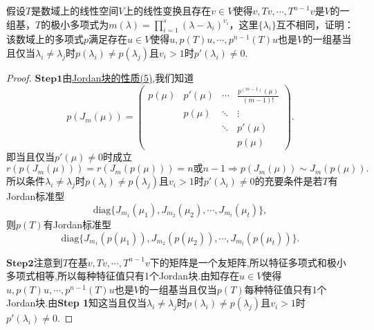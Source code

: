 \documentclass[../../main.tex]{subfiles}%
\begin{document}
\begin{example}
假设\( T \)是数域上的线性空间\( V \)上的线性变换且存在\( v \in V \)使得\( v,Tv,\cdots,T^{n-1}v \)是\( V \)的一组基，\( T \)的极小多项式为\( m(\lambda)=\prod_{i=1}^{s}(\lambda-\lambda_i)^{v_i} \)，这里\( \{\lambda_i\} \)互不相同，证明：该数域上的多项式\( p \)满足存在\( u \in V \)使得\( u,p(T)u,\cdots,p^{n-1}(T)u \)也是\( V \)的一组基当且仅当\( \lambda_i \neq \lambda_j \)时\( p(\lambda_i) \neq p(\lambda_j) \)且\( v_i > 1 \)时\( p'(\lambda_i) \neq 0 \).
\end{example}
\begin{proof}

$\mathbf{Step}\mathbf{1}$由\hyperref[proposition:Jordan块的性质]{Jordan块的性质(5)},我们知道
\[
p\left(J_m(\mu)\right)=\begin{pmatrix}
p(\mu)& p'(\mu)& \cdots& \frac{p^{(m-1)}(\mu)}{(m-1)!}\\
& p(\mu)& \ddots& \vdots\\
& & \ddots& p'(\mu)\\
& & & p(\mu)
\end{pmatrix}.
\]
即当且仅当$p'(\mu)\neq 0$时成立
\[
r\left( p\left( J_m(\mu ) \right) \right) =r\left( J_m(p(\mu )) \right) =n\text{或}n-1\Longrightarrow 
p\left(J_m(\mu)\right)\sim J_m(p(\mu)).
\]
所以条件$\lambda_i\neq \lambda_j$时$p(\lambda_i)\neq p(\lambda_j)$且$v_i>1$时$p'(\lambda_i)\neq 0$的充要条件是若$T$有Jordan标准型
\[
\text{diag}\{J_{m_1}(\mu_1),J_{m_2}(\mu_2),\cdots,J_{m_t}(\mu_t)\},
\]
则$p(T)$有Jordan标准型
\[
\text{diag}\{J_{m_1}(p(\mu_1)),J_{m_2}(p(\mu_2)),\cdots,J_{m_t}(p(\mu_t))\}.
\]

$\mathbf{Step}\mathbf{2}$注意到$T$在基$v,Tv,\cdots,T^{n-1}v$下的矩阵是一个友矩阵,所以特征多项式和极小多项式相等,所以每种特征值只有1个Jordan块.由知存在$u\in V$使得$u,p(T)u,\cdots,p^{n-1}(T)u$也是$V$的一组基当且仅当$p(T)$每种特征值只有1个Jordan块.由\textbf{Step 1}知这当且仅当$\lambda_i\neq \lambda_j$时$p(\lambda_i)\neq p(\lambda_j)$且$v_i>1$时$p'(\lambda_i)\neq 0$.
\end{proof}
\end{document}
